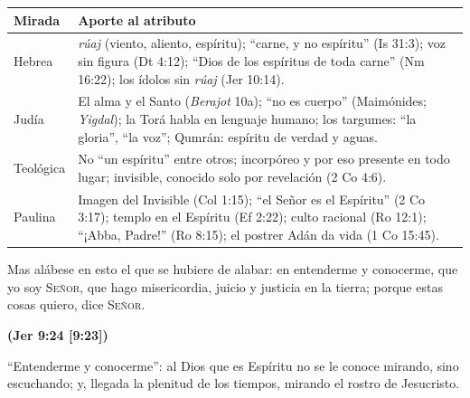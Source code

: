 \documentclass[11pt,letterpaper]{article}
\newcommand{\SENOR}{\textsc{Señor}}
\newcommand{\fuente}[1]{\par\hfill{\upshape\bfseries\small\textcolor{azul}{#1}}}
\begin{document}
\begin{center}\small\renewcommand{\arraystretch}{1.3}
\begin{tabular}{@{}L{3.0cm}L{11.4cm}@{}}
\toprule
\textbf{Mirada} & \textbf{Aporte al atributo} \\ \midrule
Hebrea & \emph{rúaj} (viento, aliento, espíritu); ``carne, y no espíritu'' (Is 31:3); voz sin figura (Dt 4:12); ``Dios de los espíritus de toda carne'' (Nm 16:22); los ídolos sin \emph{rúaj} (Jer 10:14). \\
Judía & El alma y el Santo (\emph{Berajot} 10a); ``no es cuerpo'' (Maimónides; \emph{Yigdal}); la Torá habla en lenguaje humano; los targumes: ``la gloria'', ``la voz''; Qumrán: espíritu de verdad y aguas. \\
Teológica & No ``un espíritu'' entre otros; incorpóreo y por eso presente en todo lugar; invisible, conocido solo por revelación (2 Co 4:6). \\
Paulina & Imagen del Invisible (Col 1:15); ``el Señor es el Espíritu'' (2 Co 3:17); templo en el Espíritu (Ef 2:22); culto racional (Ro 12:1); ``¡Abba, Padre!'' (Ro 8:15); el postrer Adán da vida (1 Co 15:45). \\
\bottomrule
\end{tabular}\end{center}

\begin{cita}Mas alábese en esto el que se hubiere de alabar: en entenderme y conocerme, que yo soy \SENOR{}, que hago misericordia, juicio y justicia en la tierra; porque estas cosas quiero, dice \SENOR{}.\fuente{(Jer 9:24 [9:23])}\end{cita}

``Entenderme y conocerme'': al Dios que es Espíritu no se le conoce mirando, sino escuchando; y, llegada la plenitud de los tiempos, mirando el rostro de Jesucristo.

\end{document}

